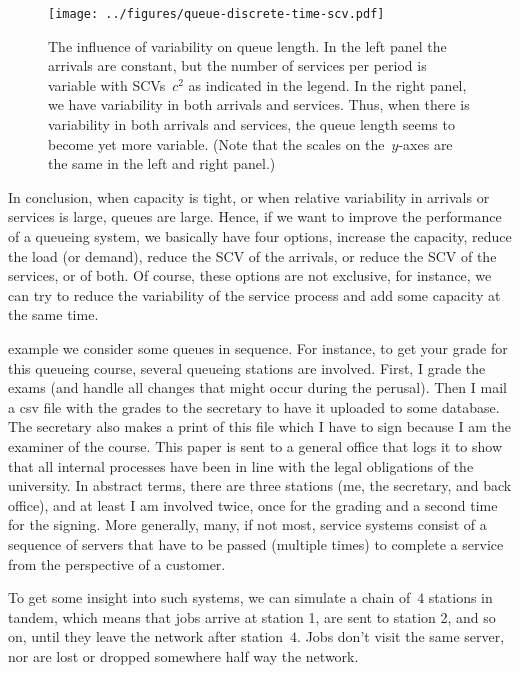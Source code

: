 \documentclass[stochastic-or.tex]{subfiles}
\begin{document}
\begin{figure}[tb]
\centering
  \texttt{[image: ../figures/queue-discrete-time-scv.pdf]}

  \caption{The influence of variability on queue length.
In the left panel the arrivals are constant, but the number of services per period is variable with SCVs~$c^{2}$ as indicated in the legend.
In the right panel, we have variability in both arrivals and services.
Thus, when there is variability in both arrivals and services, the queue length seems to become yet more variable.
(Note that the scales on the~$y$-axes are the same in the left and right panel.)}
\label{fig:scv}
\end{figure}

In conclusion, when capacity is tight, or when relative variability in arrivals or services is large, queues are large.
Hence, if we want to improve the performance of a queueing system, we basically have four options, increase the capacity, reduce the load (or demand), reduce the SCV of the arrivals, or reduce the SCV of the services, or of both.
Of course, these options are not exclusive, for instance, we can try to reduce the variability of the service process and add some capacity at the same time.



 example we consider some queues in sequence.
For instance, to get your grade for this queueing course, several queueing stations are involved.
First, I grade the exams (and handle all changes that might occur during the perusal).
Then I mail a csv file with the grades to the secretary to have it uploaded to some database.
The secretary also makes a print of this file which I have to sign because I am the examiner of the course.
This paper is sent to a general office that logs it to show that all internal processes have been in line with the legal obligations of the university.
In abstract terms, there are three stations (me, the secretary, and back office), and at least I am involved twice, once for the grading and a second time for the signing.
More generally, many, if not most, service systems consist of a sequence of servers that have to be passed (multiple times) to complete a service from the perspective of a customer.

To get some insight into such systems, we can simulate a chain of~$4$ stations in tandem, which means that jobs arrive at station 1, are sent to station 2, and so on, until they leave the network after station~$4$.
Jobs don't visit the same server, nor are lost or dropped somewhere half way the network.
\end{document}
